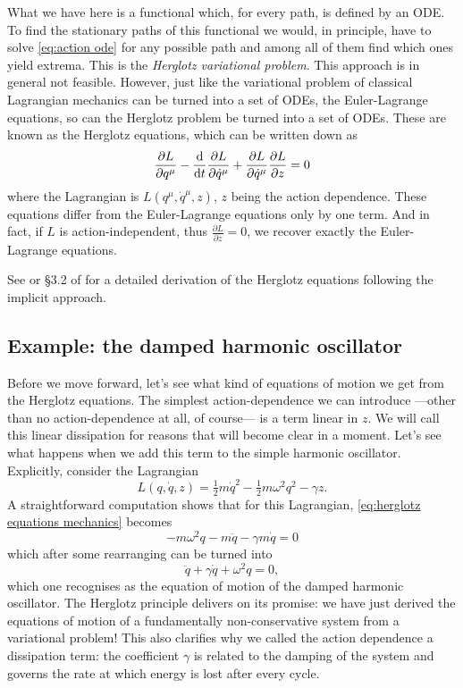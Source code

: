 \documentclass[../main.tex]{subfiles}
\begin{document}
What we have here is a functional which, for every path, is defined by an ODE. To find the
stationary paths of this functional we would, in principle, have to solve
\cref{eq:action ode} for any possible path and among all of them find which ones yield
extrema. This is the \emph{Herglotz variational problem}. This approach is in general not
feasible. However, just like the variational problem of classical Lagrangian mechanics can
be turned into a set of ODEs, the Euler-Lagrange equations, so can the Herglotz problem be
turned into a set of ODEs. These are known as the Herglotz equations, which can be written
down as
\begin{equation}\label{eq:herglotz equations mechanics}
	\frac{\partial L}{\partial q^\mu} - \frac{\mathrm{d}}{\mathrm{d} t}\frac{\partial L}{\partial \dot{q}^\mu}
	+\frac{\partial L}{\partial \dot{q}^\mu} \frac{\partial L}{\partial z} = 0
\end{equation}
where the Lagrangian is \( L(q^\mu, \dot{q}^\mu, z) \), \( z \) being the action
dependence. These equations differ from the Euler-Lagrange equations only by one term. And
in fact, if \( L \) is action-independent, thus \( \frac{\partial L}{\partial z} = 0 \),
we recover exactly the Euler-Lagrange equations. 

See \cite{Lazo2018} or \S 3.2 of \cite{Leon2021} for a detailed derivation of the Herglotz
equations following the implicit approach. 

\subsection{Example: the damped harmonic oscillator}
Before we move forward, let's see what kind of equations of motion we get from the
Herglotz equations. The simplest action-dependence we can introduce ---other than no
action-dependence at all, of course--- is a term linear in \( z \). We will call this
linear dissipation for reasons that will become clear in a moment. Let's see what happens
when we add this term to the simple harmonic oscillator. Explicitly, consider the
Lagrangian
\begin{equation*}
	L(q, \dot{q}, z) = \tfrac{1}{2}m\dot{q}^2 - \tfrac{1}{2} m\omega^2 q^2 - \gamma z. 
\end{equation*}
A straightforward computation shows that for this Lagrangian, \cref{eq:herglotz equations
mechanics} becomes
\begin{equation*}
	-m\omega^2 q - m\ddot{q} - \gamma m \dot{q} = 0
\end{equation*}
which after some rearranging can be turned into
\begin{equation}\label{eq:damped harmonic oscillator}
	\ddot{q} + \gamma\dot{q} + \omega^2 q = 0,
\end{equation}
which one recognises as the equation of motion of the damped harmonic oscillator. The
Herglotz principle delivers on its promise: we have just derived the equations of motion
of a fundamentally non-conservative system from a variational problem! This also clarifies
why we called the action dependence a dissipation term: the coefficient \( \gamma \) is
related to the damping of the system and governs the rate at which energy is lost after
every cycle. 
\end{document}
